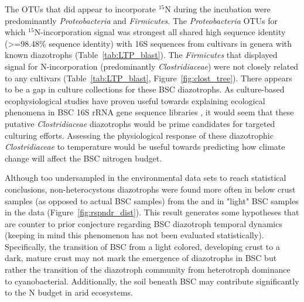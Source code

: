 The OTUs that did appear to incorporate $^{15}$N during the incubation were
predominantly \textit{Proteobacteria} and \textit{Firmicutes}. The
\textit{Proteobacteria} OTUs for which $^{15}$N-incorporation signal was
strongest all shared high sequence identity (\textgreater=98.48\% sequence
identity) with 16S sequences from cultivars in genera with known diazotrophs
(Table~\ref{tab:LTP_blast}). The
\textit{Firmicutes} that displayed signal for N-incorporation (predominantly
\textit{Clostridiaceae}) were not closely related to any cultivars
(Table~\ref{tab:LTP_blast}, Figure~\ref{fig:clost_tree}). There appears to be a
gap in culture collections for these BSC diazotrophs. As culture-based
ecophysiological studies have proven useful towards explaining ecological
phenomena in BSC 16S rRNA gene sequence libraries \citep{Garcia_Pichel_2013},
it would seem that these putative \textit{Clostridiaceae} diazotrophs would be
prime candidates for targeted culturing efforts. Assessing the physiological
response of these diazotrophic \textit{Clostridiaceae} to temperature would be
useful towards predicting how climate change will affect the BSC nitrogen
budget. 

Although too undersampled in the environmental data sets to reach statistical
conclusions, non-heterocystous diazotrophs were found more often in below crust
samples (as opposed to actual BSC samples) from the \citet{Steven_2013} and in
"light" BSC samples in the \citet{Garcia_Pichel_2013} data
(Figure~\ref{fig:rspndr_dist}). This result generates some hypotheses that are
counter to prior conjecture regarding BSC diazotroph temporal dynamics (keeping
in mind this phenomenon has not been evaluated statistically). Specifically,
the transition of BSC from a light colored, developing crust to a dark, mature
crust may not mark the emergence of diazotrophs in BSC but rather the transition
of the diazotroph community from heterotroph dominance to cyanobacterial.
Additionally, the soil beneath BSC may contribute significantly to the N budget
in arid ecosystems.

